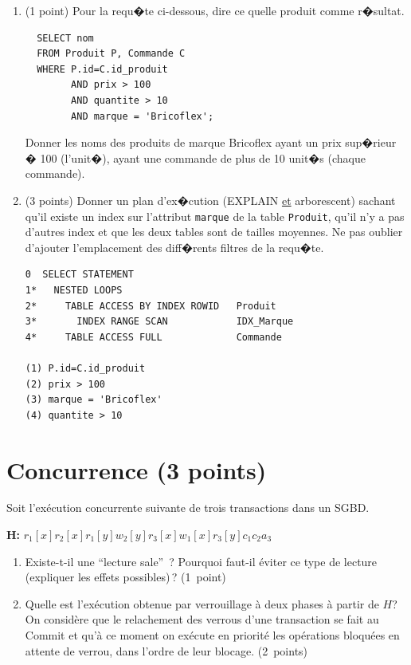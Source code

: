 \begin{enumerate}
 \item (1 point) Pour la requ�te ci-dessous, dire ce quelle produit comme r�sultat.
\begin{lstlisting}
  SELECT nom
  FROM Produit P, Commande C
  WHERE P.id=C.id_produit
        AND prix > 100
        AND quantite > 10
        AND marque = 'Bricoflex';
\end{lstlisting}
\begin{correction}
Donner les noms des produits de marque Bricoflex ayant un prix sup�rieur � 100 (l'unit�), ayant une commande de plus de 10 unit�s (chaque commande).
\end{correction}
 \item (3 points) Donner un plan d'ex�cution (EXPLAIN \underline{et} arborescent) sachant qu'il existe un index sur l'attribut {\tt marque} de la table {\tt Produit}, qu'il n'y a pas d'autres index et que les deux tables sont de tailles moyennes.
Ne pas oublier d'ajouter l'emplacement des diff�rents filtres de la requ�te.
\begin{correction}
\begin{verbatim}
0  SELECT STATEMENT
1*   NESTED LOOPS
2*     TABLE ACCESS BY INDEX ROWID   Produit
3*       INDEX RANGE SCAN            IDX_Marque
4*     TABLE ACCESS FULL             Commande

(1) P.id=C.id_produit
(2) prix > 100
(3) marque = 'Bricoflex'
(4) quantite > 10
\end{verbatim}
\end{correction}
\end{enumerate}

\section{Concurrence (3 points)}

Soit l'ex\'ecution concurrente suivante de trois transactions dans un SGBD.

\textbf{H:} $r_1[x] r_2[x] r_1[y] w_2[y] r_3[x] w_1[x] r_3[y] c_1 c_2 a_3$

\begin{enumerate}
   \item Existe-t-il une ``lecture sale''~? Pourquoi faut-il \'eviter
   ce type de lecture (expliquer les effets possibles)\,? (1~point)

     \item Quelle est l'ex\'ecution obtenue par verrouillage \`a deux phases
   \`a partir de $H$? On consid\`ere que le relachement des verrous d'une
   transaction se fait au Commit et qu'\`a ce moment on ex\'ecute en priorit\'e les op\'erations bloqu\'ees
      en attente de verrou, dans l'ordre de leur blocage. (2~points)
\end{enumerate}
